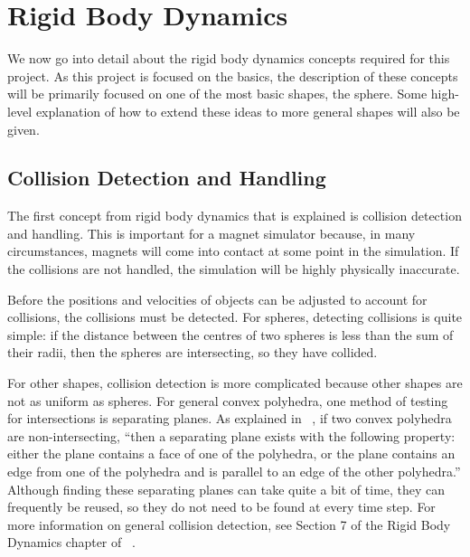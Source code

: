 \documentclass[tog]{acmsiggraph}
\begin{document}
\section{Rigid Body Dynamics}

We now go into detail about the rigid body dynamics concepts required for this project. As this project is focused on the basics, the description of these concepts will be primarily focused on one of the most basic shapes, the sphere. Some high-level explanation of how to extend these ideas to more general shapes will also be given.

\subsection{Collision Detection and Handling}

The first concept from rigid body dynamics that is explained is collision detection and handling. This is important for a magnet simulator because, in many circumstances, magnets will come into contact at some point in the simulation. If the collisions are not handled, the simulation will be highly physically inaccurate.

Before the positions and velocities of objects can be adjusted to account for collisions, the collisions must be detected. For spheres, detecting collisions is quite simple: if the distance between the centres of two spheres is less than the sum of their radii, then the spheres are intersecting, so they have collided.

For other shapes, collision detection is more complicated because other shapes are not as uniform as spheres. For general convex polyhedra, one method of testing for intersections is separating planes. As explained in ~\cite{pixarnotes}, if two convex polyhedra are non-intersecting, ``then a separating plane exists with the following property: either the plane contains a face of one of the polyhedra, or the plane contains an edge from one of the polyhedra and is parallel to an edge of the other polyhedra.'' Although finding these separating planes can take quite a bit of time, they can frequently be reused, so they do not need to be found at every time step. For more information on general collision detection, see Section 7 of the Rigid Body Dynamics chapter of ~\cite{pixarnotes}.
\end{document}
